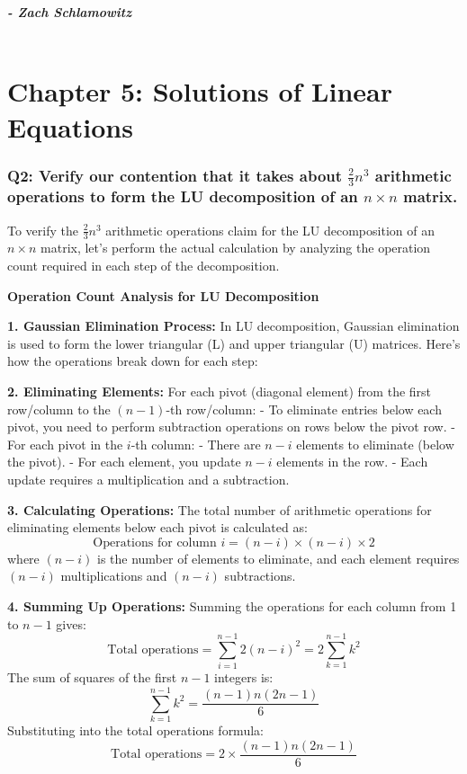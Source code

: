 \documentclass{article}
\begin{document}
\textbf{\textit{- Zach Schlamowitz }} \\\\

\newpage

\section*{Chapter 5: Solutions of Linear Equations}

\subsubsection*{Q2: Verify our contention that it takes about \(\frac{2}{3} n^3\) arithmetic operations to form the LU decomposition of an \(n \times n\) matrix.}

To verify the \(\frac{2}{3} n^3\) arithmetic operations claim for the LU decomposition of an \(n \times n\) matrix, let's perform the actual calculation by analyzing the operation count required in each step of the decomposition.

\textbf{Operation Count Analysis for LU Decomposition}

\textbf{1. Gaussian Elimination Process:}
   In LU decomposition, Gaussian elimination is used to form the lower triangular (L) and upper triangular (U) matrices. Here's how the operations break down for each step:

\textbf{2. Eliminating Elements:}
   For each pivot (diagonal element) from the first row/column to the \((n-1)\)-th row/column:
   - To eliminate entries below each pivot, you need to perform subtraction operations on rows below the pivot row.
   - For each pivot in the \(i\)-th column:
     - There are \(n-i\) elements to eliminate (below the pivot).
     - For each element, you update \(n-i\) elements in the row.
     - Each update requires a multiplication and a subtraction.

\textbf{3. Calculating Operations:}
   The total number of arithmetic operations for eliminating elements below each pivot is calculated as:
   \[
   \text{Operations for column } i = (n-i) \times (n-i) \times 2
   \]
   where \( (n-i) \) is the number of elements to eliminate, and each element requires \( (n-i) \) multiplications and \( (n-i) \) subtractions.

\textbf{4. Summing Up Operations:}
   Summing the operations for each column from 1 to \(n-1\) gives:
   \[
   \text{Total operations} = \sum_{i=1}^{n-1} 2(n-i)^2 = 2\sum_{k=1}^{n-1} k^2
   \]
   The sum of squares of the first \(n-1\) integers is:
   \[
   \sum_{k=1}^{n-1} k^2 = \frac{(n-1)n(2n-1)}{6}
   \]
   Substituting into the total operations formula:
   \[
   \text{Total operations} = 2 \times \frac{(n-1)n(2n-1)}{6}
   \]
\end{document}
